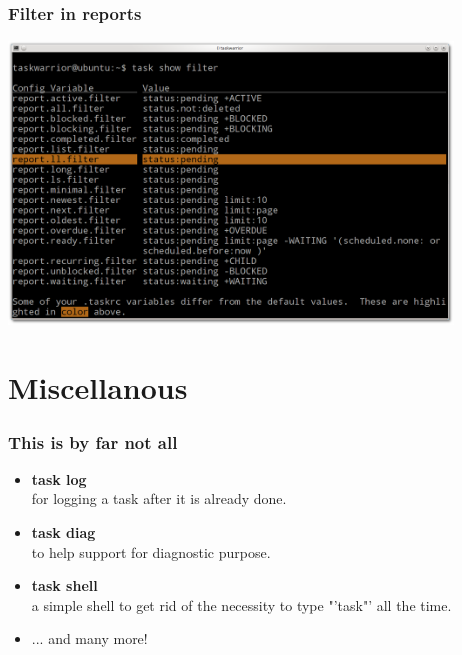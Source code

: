 \documentclass[t,handout]{beamer}
\begin{document}
\begin{frame}[fragile]\frametitle{Filter in reports}
\begin{center} %
\includegraphics[width=11.8cm,height=7.5cm]{filter-in-reports.png}
\end{center}
\end{frame}

\section{Miscellanous}

\begin{frame}\frametitle{This is by far not all}
\begin{itemize}
\item \textbf{task log}  \\
for logging a task after it is already done.
\item \textbf{task diag} \\
to help support for diagnostic purpose.
\item \textbf{task shell} \\
a simple shell to get rid of the necessity to type "'task"' all the time.
\item ... and many more!
\end{itemize}
\end{frame}
\end{document}
